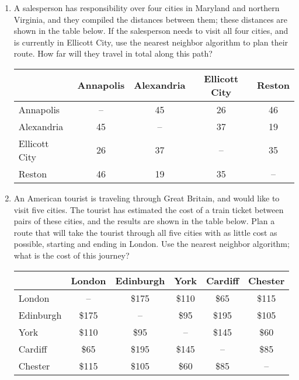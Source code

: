 \begin{enumerate}
\item A salesperson has responsibility over four cities in Maryland and northern Virginia, and they compiled the distances between them; these distances are shown in the table below.    If the salesperson needs to visit all four cities, and is currently in Ellicott City, use the nearest neighbor algorithm to plan their route.  How far will they travel in total along this path?
{\footnotesize\begin{center}
\begin{tabular}{l | c c c c}
& Annapolis & Alexandria & Ellicott City & Reston\\
\hline
Annapolis & -- & 45 & 26 & 46\\
Alexandria & 45 & -- & 37 & 19\\
Ellicott City & 26 & 37 & -- & 35\\
Reston & 46 & 19 & 35 & --
\end{tabular}
\end{center}}

\item An American tourist is traveling through Great Britain, and would like to visit five cities.  The tourist has estimated the cost of a train ticket between pairs of these cities, and the results are shown in the table below.  Plan a route that will take the tourist through all five cities with as little cost as possible, starting and ending in London.  Use the nearest neighbor algorithm; what is the cost of this journey?
{\footnotesize\begin{center}
\begin{tabular}{l | c c c c c}
& London & Edinburgh & York & Cardiff & Chester\\
\hline
London & -- & \$175 & \$110 & \$65 & \$115\\
Edinburgh & \$175 & -- & \$95 & \$195 & \$105\\
York & \$110 & \$95 & -- & \$145 & \$60\\
Cardiff & \$65 & \$195 & \$145 & -- & \$85\\
Chester & \$115 & \$105 & \$60 & \$85 & --
\end{tabular}
\end{center}}
\end{enumerate}